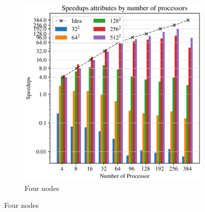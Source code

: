 \begin{frame}
\begin{figure}
\begin{subfigure}{0.42\textwidth}
      \includegraphics[width=\textwidth]{figure/FIG_Benchmark_pure_mpi_3D_multi_nodes.pdf}
      \caption{Four nodes}
      \label{FIG:Benchmark:Pure_MPI_Multi_Node_3D}
    \end{subfigure}
    \label{FIG:Benchmark:Pure_MPI_Node_3D}
  \end{figure}
  
\end{frame}



